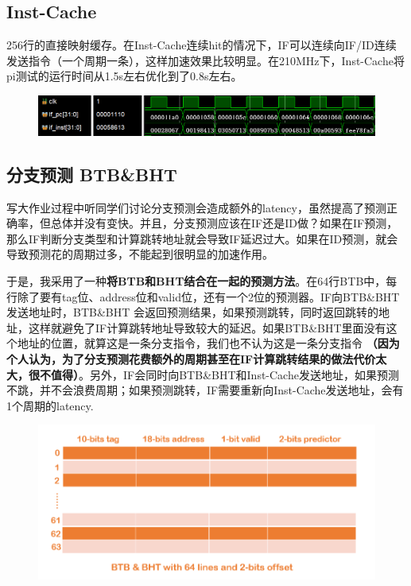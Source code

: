 \documentclass[a4paper,UTF8]{article}
\begin{document}
\subsection{Inst-Cache}
256行的直接映射缓存。在Inst-Cache连续hit的情况下，IF可以连续向IF/ID连续发送指令（一个周期一条），这样加速效果比较明显。在210MHz下，Inst-Cache将pi测试的运行时间从1.5s左右优化到了0.8s左右。
\begin{figure}[h]
    \centering
	\includegraphics[width=1\linewidth]{4.png}
\end{figure}

\subsection{分支预测 BTB\&BHT}
写大作业过程中听同学们讨论分支预测会造成额外的latency，虽然提高了预测正确率，但总体并没有变快。并且，分支预测应该在IF还是ID做？如果在IF预测，那么IF判断分支类型和计算跳转地址就会导致IF延迟过大。如果在ID预测，就会导致预测花的周期过多，不能起到很明显的加速作用。

于是，我采用了一种\textbf{将BTB和BHT结合在一起的预测方法}。在64行BTB中，每行除了要有tag位、address位和valid位，还有一个2位的预测器。IF向BTB\&BHT发送地址时，BTB\&BHT 会返回预测结果，如果预测跳转，同时返回跳转的地址，这样就避免了IF计算跳转地址导致较大的延迟。如果BTB\&BHT里面没有这个地址的位置，就算这是一条分支指令，我们也不认为这是一条分支指令
\textbf{（因为个人认为，为了分支预测花费额外的周期甚至在IF计算跳转结果的做法代价太大，很不值得）}。另外，IF会同时向BTB\&BHT和Inst-Cache发送地址，如果预测不跳，并不会浪费周期；如果预测跳转，IF需要重新向Inst-Cache发送地址，会有1个周期的latency.
\begin{figure}[h]
    \centering
	\includegraphics[width=1\linewidth]{2.png}
\end{figure}
\end{document}
